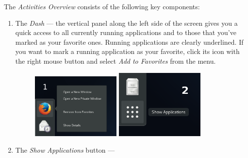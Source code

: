 The \emph{Activities Overview} consists of the following key components:
\begin{enumerate}
\item The \emph{Dash} --- the vertical panel along the left side of the screen gives you a quick access to all currently running applications and to those that you've marked as your favorite ones. Running applications are clearly underlined. If you want to mark a running application as your favorite, click its icon with the right mouse button and select \emph{Add to Favorites} from the menu.

\begin{figure}[t]
\begin{center}
\includegraphics[width=0.42\textwidth]{img/dash-b}
 \label{fig:dash-b}
\bigskip
\includegraphics[width=0.42\textwidth]{img/dash-a}
 \label{fig:dash-a}
\end{center}
\end{figure}

\item The \emph{Show Applications} button --- 



\end{enumerate}
